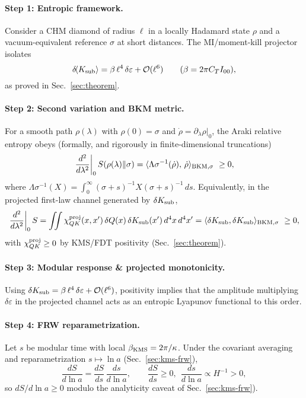 \documentclass[aps,prd,onecolumn,superscriptaddress,nofootinbib]{revtex4-2}
\def\Omega_\Lambda{OmegaLambda}%
\begin{document}
\paragraph{Step 1: Entropic framework.}
Consider a CHM diamond of radius \(\ell\) in a locally Hadamard state \(\rho\) and a vacuum-equivalent reference \(\sigma\) at short distances. The MI/moment-kill projector isolates
\[
\delta\!\langle K_{\rm sub}\rangle=\beta\,\ell^4\,\delta\varepsilon+\mathcal O(\ell^6)\qquad(\beta=2\pi C_T I_{00}),
\]
as proved in Sec.~\ref{sec:theorem}.

\paragraph{Step 2: Second variation and BKM metric.}
For a smooth path \(\rho(\lambda)\) with \(\rho(0)=\sigma\) and \(\dot\rho=\partial_\lambda\rho|_0\),
the Araki relative entropy obeys (formally, and rigorously in finite-dimensional truncations)
\[
\left.\frac{d^2}{d\lambda^2}\right|_0 S(\rho(\lambda)\Vert\sigma)
=\langle \Omega_\sigma^{-1}(\dot\rho),\,\dot\rho\rangle_{\rm BKM,\sigma}\ \ge 0,
\]
where \(\Omega_\sigma^{-1}(X)=\int_0^\infty\!\!(\sigma+s)^{-1}X(\sigma+s)^{-1}\,ds\).
Equivalently, in the projected first-law channel generated by \(\delta K_{\rm sub}\),
\[
\left.\frac{d^2}{d\lambda^2}\right|_0 S
=\iint \chi^{\rm proj}_{QK}(x,x')\,\delta Q(x)\,\delta K_{\rm sub}(x')\,d^4x\,d^4x'
=\langle \delta K_{\rm sub},\delta K_{\rm sub}\rangle_{\rm BKM,\sigma}\ \ge 0,
\]
with \(\chi^{\rm proj}_{QK}\ge 0\) by KMS/FDT positivity (Sec.~\ref{sec:theorem}).

\paragraph{Step 3: Modular response \& projected monotonicity.}
Using \(\delta K_{\rm sub}=\beta\,\ell^4\,\delta\varepsilon+\mathcal O(\ell^6)\), positivity implies that the amplitude multiplying \(\delta\varepsilon\) in the projected channel acts as an entropic Lyapunov functional to this order.

\paragraph{Step 4: FRW reparametrization.}
Let \(s\) be modular time with local \(\beta_{\rm KMS}=2\pi/\kappa\). Under the covariant averaging and reparametrization \(s\mapsto \ln a\) (Sec.~\ref{sec:kms-frw}),
\[
\frac{dS}{d\ln a}=\frac{dS}{ds}\,\frac{ds}{d\ln a},\qquad \frac{dS}{ds}\ge 0,\ \ \frac{ds}{d\ln a}\propto H^{-1}>0,
\]
so \(dS/d\ln a\ge 0\) modulo the analyticity caveat of Sec.~\ref{sec:kms-frw}).
\end{document}
